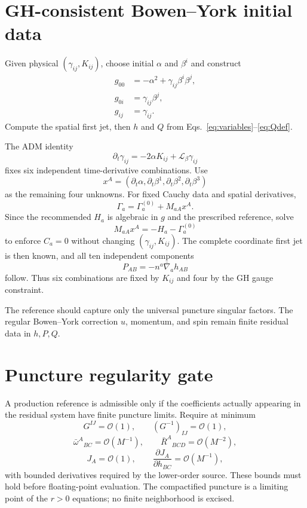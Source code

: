 \documentclass[11pt]{article}
\newcommand{\bn}{\bar\nabla}
\newcommand{\bw}{\bar\omega}
\newcommand{\bR}{\bar R}
\newcommand{\Lie}{\mathcal L}
\newcommand{\order}{\mathcal O}
\begin{document}
\section{GH-consistent Bowen--York initial data}
Given physical $(\gamma_{ij},K_{ij})$, choose initial $\alpha$ and $\beta^i$ and construct
\begin{align}
g_{00}&=-\alpha^2+\gamma_{ij}\beta^i\beta^j,\\
g_{0i}&=\gamma_{ij}\beta^j,\\
g_{ij}&=\gamma_{ij}.
\end{align}
Compute the spatial first jet, then $h$ and $Q$ from Eqs.~\eqref{eq:variables}--\eqref{eq:Qdef}.

The ADM identity
\begin{equation}
\partial_t\gamma_{ij}=-2\alpha K_{ij}+\Lie_\beta\gamma_{ij}
\label{eq:K}
\end{equation}
fixes six independent time-derivative combinations. Use
\[
x^A=(\partial_t\alpha,\partial_t\beta^1,\partial_t\beta^2,\partial_t\beta^3)
\]
as the remaining four unknowns. For fixed Cauchy data and spatial derivatives,
\[
\Gamma_a=\Gamma_a^{(0)}+M_{aA}x^A.
\]
Since the recommended $H_a$ is algebraic in $g$ and the prescribed reference, solve
\begin{equation}
\boxed{M_{aA}x^A=-H_a-\Gamma_a^{(0)}}
\label{eq:4x4}
\end{equation}
to enforce $C_a=0$ without changing $(\gamma_{ij},K_{ij})$. The complete coordinate first jet is then known, and all ten independent components
\[
P_{AB}=-n^a\bn_a h_{AB}
\]
follow. Thus six combinations are fixed by $K_{ij}$ and four by the GH gauge constraint.

The reference should capture only the universal puncture singular factors. The regular Bowen--York correction $u$, momentum, and spin remain finite residual data in $h,P,Q$.

\section{Puncture regularity gate}
A production reference is admissible only if the coefficients actually appearing in the residual system have finite puncture limits. Require at minimum
\[
G^{IJ}=\order(1),\qquad (G^{-1})_{IJ}=\order(1),
\]
\[
\bw^A{}_{BC}=\order(M^{-1}),\qquad \bR^A{}_{BCD}=\order(M^{-2}),
\]
\[
J_A=\order(1),\qquad \frac{\partial J_A}{\partial h_{BC}}=\order(M^{-1}),
\]
with bounded derivatives required by the lower-order source. These bounds must hold before floating-point evaluation. The compactified puncture is a limiting point of the $r>0$ equations; no finite neighborhood is excised.
\end{document}
